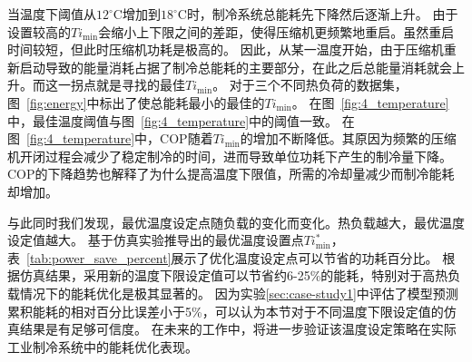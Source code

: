当温度下阈值从${12}^{\circ} \mathrm{C}$增加到${18}^{\circ} \mathrm{C}$时，制冷系统总能耗先下降然后逐渐上升。
由于设置较高的$Ti_{\min}$会缩小上下限之间的差距，使得压缩机更频繁地重启。虽然重启时间较短，但此时压缩机功耗是极高的。
因此，从某一温度开始，由于压缩机重新启动导致的能量消耗占据了制冷总能耗的主要部分，在此之后总能量消耗就会上升。而这一拐点就是寻找的最佳$Ti_{\min}$。
对于三个不同热负荷的数据集，图~\ref{fig:energy}中标出了使总能耗最小的最佳的$Ti_{\min}$。
在图~\ref{fig:4_temperature}中，最佳温度阈值与图~\ref{fig:4_temperature}中的阈值一致。
在图~\ref{fig:4_temperature}中，COP随着$Ti_{\min}$的增加不断降低。其原因为频繁的压缩机开闭过程会减少了稳定制冷的时间，进而导致单位功耗下产生的制冷量下降。
COP的下降趋势也解释了为什么提高温度下限值，所需的冷却量减少而制冷能耗却增加。

与此同时我们发现，最优温度设定点随负载的变化而变化。热负载越大，最优温度设定值越大。
基于仿真实验推导出的最优温度设置点$Ti^*_{\min}$，表~\ref{tab:power_save_percent}展示了优化温度设定点可以节省的功耗百分比。
根据仿真结果，采用新的温度下限设定值可以节省约6-25\%的能耗，特别对于高热负载情况下的能耗优化是极其显著的。
因为实验\ref{sec:case-study1}中评估了模型预测累积能耗的相对百分比误差小于5\%，可以认为本节对于不同温度下限设定值的仿真结果是有足够可信度。
在未来的工作中，将进一步验证该温度设定策略在实际工业制冷系统中的能耗优化表现。

